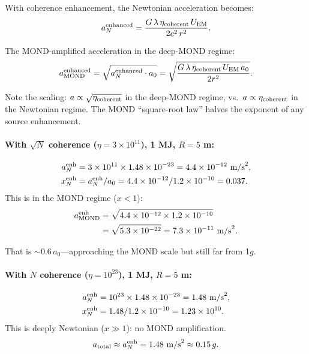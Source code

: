 \documentclass[aps,prd,twocolumn,superscriptaddress,nofootinbib]{revtex4-2}
\newcommand{\ee}[1]{\times 10^{#1}}
\newcommand{\lam}{\lambda}
\begin{document}
With coherence enhancement, the Newtonian acceleration becomes:
\begin{equation}
a_N^{\rm enhanced} = \frac{G\,\lam\,\eta_{\rm coherent}\,U_{\rm EM}}{2c^2\,r^2}.
\end{equation}

The MOND-amplified acceleration in the deep-MOND regime:
\begin{equation}
a_{\rm MOND}^{\rm enhanced} = \sqrt{a_N^{\rm enhanced}\cdot a_0}
= \sqrt{\frac{G\,\lam\,\eta_{\rm coherent}\,U_{\rm EM}\,a_0}{2r^2}}.
\end{equation}

Note the scaling: $a \propto \sqrt{\eta_{\rm coherent}}$ in the
deep-MOND regime, vs.\ $a \propto \eta_{\rm coherent}$ in the
Newtonian regime.  The MOND ``square-root law'' halves the
exponent of any source enhancement.

\paragraph{With $\sqrt{N}$ coherence ($\eta = 3\ee{11}$), 1 MJ, $R = 5$ m:}
\begin{align}
a_N^{\rm enh} &= 3\ee{11}\times 1.48\ee{-23} = 4.4\ee{-12}~\text{m/s}^2, \\
x_N^{\rm enh} &= a_N^{\rm enh}/a_0 = 4.4\ee{-12}/1.2\ee{-10} = 0.037.
\end{align}
This is in the MOND regime ($x < 1$):
\begin{align}
a_{\rm MOND}^{\rm enh} &= \sqrt{4.4\ee{-12}\times 1.2\ee{-10}} \notag\\
&= \sqrt{5.3\ee{-22}} = 7.3\ee{-11}~\text{m/s}^2.
\end{align}

That is $\sim 0.6\,a_0$---approaching the MOND scale but still far
from 1$g$.

\paragraph{With $N$ coherence ($\eta = 10^{23}$), 1 MJ, $R = 5$ m:}
\begin{align}
a_N^{\rm enh} &= 10^{23}\times 1.48\ee{-23} = 1.48~\text{m/s}^2, \\
x_N^{\rm enh} &= 1.48/1.2\ee{-10} = 1.23\ee{10}.
\end{align}
This is deeply Newtonian ($x \gg 1$): no MOND amplification.
\begin{equation}
a_{\rm total} \approx a_N^{\rm enh} = 1.48~\text{m/s}^2 \approx 0.15\,g.
\end{equation}
\end{document}
